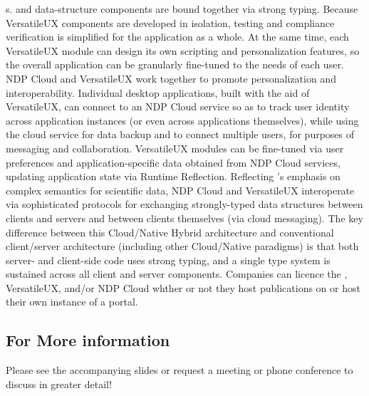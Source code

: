 \documentclass[11pt,letterpaper]{article}
\begin{document}
{\GUI}s.  {\GUI} and data-structure components are 
bound together via strong typing.  Because VersatileUX 
components are developed in isolation, testing and 
compliance verification is simplified for the application 
as a whole.  At the same time, each VersatileUX 
module can design its own scripting and personalization 
features, so the overall application can be 
granularly fine-tuned to the needs of each user.
\p{}
NDP Cloud and VersatileUX work together to 
promote personalization and interoperability.  
Individual desktop applications, built 
with the aid of VersatileUX, can connect to an 
NDP Cloud service so as to track user identity across 
application instances (or even across applications themselves), 
while using the cloud service for data backup and 
to connect multiple users, for purposes of 
messaging and collaboration.  
VersatileUX modules can be fine-tuned via 
user preferences and application-specific data obtained from 
NDP Cloud services, updating application state via 
Runtime Reflection.  Reflecting {\MOSAIC}'s 
emphasis on complex semantics for scientific data, 
NDP Cloud and VersatileUX interoperate via 
sophisticated protocols for exchanging 
strongly-typed data structures between clients and 
servers and between clients themselves (via cloud messaging).  
The key difference between this Cloud/Native Hybrid 
architecture and conventional client/server architecture 
(including other Cloud/Native paradigms) is that 
both server- and client-side code uses 
strong typing, and a single type system is 
sustained across all client and server components.
\p{}
Companies can licence the {\MOSAIC} {\SDK}, VersatileUX, and/or 
NDP Cloud whther or not they 
host publications on {\MOSAIC} or host their own instance 
of a {\MOSAIC} portal.

\subsection{For More information}
Please see the accompanying slides or request a meeting 
or phone conference to discuss {\MOSAIC} in greater detail!
\end{document}
